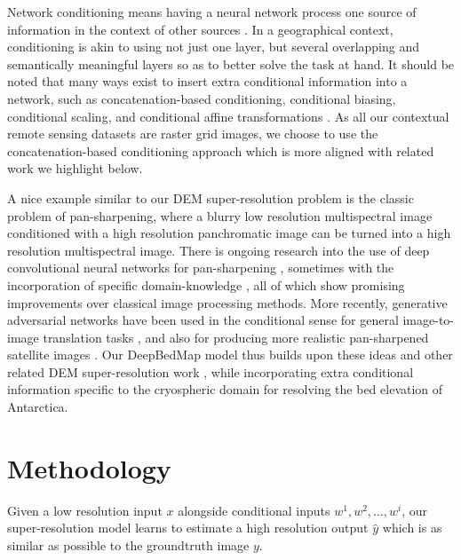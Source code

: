 \documentclass[tc, manuscript]{copernicus}
\begin{document}
Network conditioning means having a neural network process one source of information in the context of other sources \citep{DumoulinFeaturewisetransformations2018}.
In a geographical context, conditioning is akin to using not just one layer, but several overlapping and semantically meaningful layers so as to better solve the task at hand.
It should be noted that many ways exist to insert extra conditional information into a network, such as concatenation-based conditioning, conditional biasing, conditional scaling, and conditional affine transformations \citep{DumoulinFeaturewisetransformations2018}.
As all our contextual remote sensing datasets are raster grid images, we choose to use the concatenation-based conditioning approach which is more aligned with related work we highlight below.

A nice example similar to our DEM super-resolution problem is the classic problem of pan-sharpening, where a blurry low resolution multispectral image conditioned with a high resolution panchromatic image can be turned into a high resolution multispectral image.
There is ongoing research into the use of deep convolutional neural networks for pan-sharpening \citep{MasiPansharpeningConvolutionalNeural2016,ScarpaTargetAdaptiveCNNBasedPansharpening2018}, sometimes with the incorporation of specific domain-knowledge \citep{YangPanNetDeepNetwork2017}, all of which show promising improvements over classical image processing methods.
More recently, generative adversarial networks \citep{GoodfellowGenerativeAdversarialNetworks2014} have been used in the conditional sense for general image-to-image translation tasks \citep[e.g.][]{IsolaImagetoImageTranslationConditional2016,ParkSemanticImageSynthesis2019}, and also for producing more realistic pan-sharpened satellite images \citep{LiuPSGANGenerativeAdversarial2018}.
Our DeepBedMap model thus builds upon these ideas and other related DEM super-resolution work \citep{XuNonlocalsimilaritybased2015,ChenConvolutionalNeuralNetwork2016}, while incorporating extra conditional information specific to the cryospheric domain for resolving the bed elevation of Antarctica.

\section{Methodology}

Given a low resolution input $x$ alongside conditional inputs $w^1, w^2, \dots, w^i$, our super-resolution model learns to estimate a high resolution output $\hat{y}$ which is as similar as possible to the groundtruth image $y$.
\end{document}
